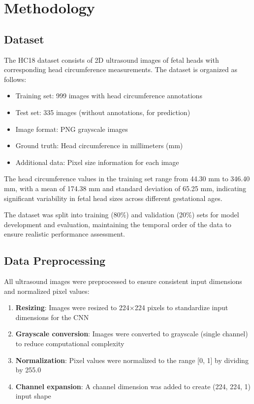\documentclass[conference]{IEEEtran}
\begin{document}
\section{Methodology}

\subsection{Dataset}

The HC18 dataset consists of 2D ultrasound images of fetal heads with corresponding head circumference measurements. The dataset is organized as follows:
\begin{itemize}
    \item Training set: 999 images with head circumference annotations
    \item Test set: 335 images (without annotations, for prediction)
    \item Image format: PNG grayscale images
    \item Ground truth: Head circumference in millimeters (mm)
    \item Additional data: Pixel size information for each image
\end{itemize}

The head circumference values in the training set range from 44.30 mm to 346.40 mm, with a mean of 174.38 mm and standard deviation of 65.25 mm, indicating significant variability in fetal head sizes across different gestational ages.

The dataset was split into training (80\%) and validation (20\%) sets for model development and evaluation, maintaining the temporal order of the data to ensure realistic performance assessment.

\subsection{Data Preprocessing}

All ultrasound images were preprocessed to ensure consistent input dimensions and normalized pixel values:

\begin{enumerate}
    \item \textbf{Resizing}: Images were resized to 224×224 pixels to standardize input dimensions for the CNN
    \item \textbf{Grayscale conversion}: Images were converted to grayscale (single channel) to reduce computational complexity
    \item \textbf{Normalization}: Pixel values were normalized to the range [0, 1] by dividing by 255.0
    \item \textbf{Channel expansion}: A channel dimension was added to create (224, 224, 1) input shape
\end{enumerate}
\end{document}
